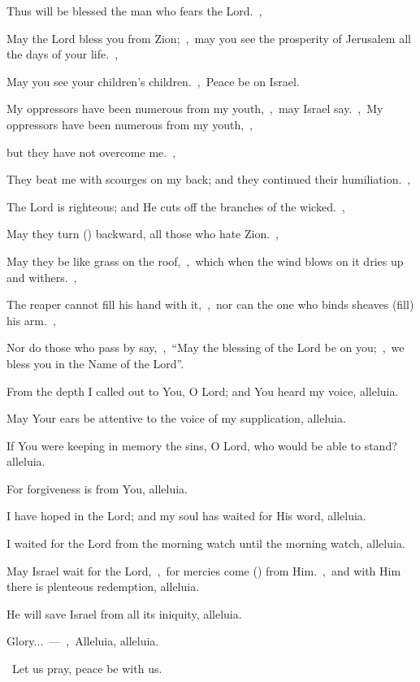 \documentclass[12pt,twoside,a5paper]{article}
\begin{document}
\begin{halfparskip}
  Thus will be blessed the man who fears the Lord.~\sep

  May the Lord bless you from Zion;~\sep\ may you see the prosperity of Jerusalem all the days of your life.~\sep

  May you see your children's children.~\sep\ Peace be on Israel.

   My oppressors have been numerous from my youth,~\sep\ may Israel say.~\sep\ My oppressors have been numerous from my youth,~\sep

  but they have not overcome me.~\sep

  They beat me with scourges on my back; and they continued their humiliation.~\sep

  The Lord is righteous; and He cuts off the branches of the wicked.~\sep

  May they turn () backward, all those who hate Zion.~\sep

  May they be like grass on the roof,~\sep\ which when the wind blows on it dries up and withers.~\sep

  The reaper cannot fill his hand with it,~\sep\ nor can the one who binds sheaves (fill) his arm.~\sep

  Nor do those who pass by say,~\sep\ ``May the blessing of the Lord be on you;~\sep\ we bless you in the Name of the Lord''.

   From the depth I called out to You, O Lord; and You heard my voice, alleluia.

  May Your ears be attentive to the voice of my supplication, alleluia.

  If You were keeping in memory the sins, O Lord, who would be able to stand? alleluia.

  For forgiveness is from You, alleluia.

  I have hoped in the Lord; and my soul has waited for His word, alleluia.

  I waited for the Lord from the morning watch until the morning watch, alleluia.

  May Israel wait for the Lord,~\sep\ for mercies come () from Him.~\sep\ and with Him there is plenteous redemption, alleluia.

  He will save Israel from all its iniquity, alleluia.

  Glory...~---~\sep\ Alleluia, alleluia.
\end{halfparskip}

\dd~Let us pray, peace be with us.
\end{document}
